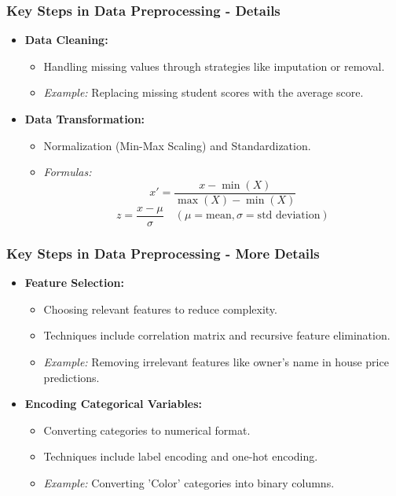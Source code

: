 \documentclass[aspectratio=169]{beamer}
\begin{document}
\begin{frame}[fragile]
    \frametitle{Key Steps in Data Preprocessing - Details}
    \begin{itemize}
        \item \textbf{Data Cleaning:}
            \begin{itemize}
                \item Handling missing values through strategies like imputation or removal.
                \item \textit{Example:} Replacing missing student scores with the average score.
            \end{itemize}
        \item \textbf{Data Transformation:}
            \begin{itemize}
                \item Normalization (Min-Max Scaling) and Standardization.
                \item \textit{Formulas:}
                  \begin{equation}
                        x' = \frac{x - \min(X)}{\max(X) - \min(X)}
                  \end{equation}
                  \begin{equation}
                        z = \frac{x - \mu}{\sigma}  \quad (\mu = \text{mean}, \sigma = \text{std deviation})
                  \end{equation}
            \end{itemize}
    \end{itemize}
\end{frame}

\begin{frame}[fragile]
    \frametitle{Key Steps in Data Preprocessing - More Details}
    \begin{itemize}
        \item \textbf{Feature Selection:}
            \begin{itemize}
                \item Choosing relevant features to reduce complexity.
                \item Techniques include correlation matrix and recursive feature elimination.
                \item \textit{Example:} Removing irrelevant features like owner's name in house price predictions.
            \end{itemize}
        \item \textbf{Encoding Categorical Variables:}
            \begin{itemize}
                \item Converting categories to numerical format.
                \item Techniques include label encoding and one-hot encoding.
                \item \textit{Example:} Converting 'Color' categories into binary columns.
            \end{itemize}
    \end{itemize}
\end{frame}
\end{document}
